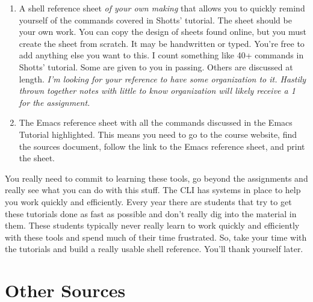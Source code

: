 \documentclass[]{tufte-handout}
\begin{document}
\begin{enumerate}
\item A shell reference sheet \textit{of your own making} that allows you to quickly remind yourself of the commands covered in Shotts' tutorial. The sheet should be your own work. You can copy the design of sheets found online, but you must create the sheet from scratch. It may be handwritten or typed. You're free to add anything else you want to this. I count something like 40+ commands in Shotts' tutorial. Some are given to you in passing. Others are discussed at length.  \textit{I'm looking for your reference to have some organization to it. Hastily thrown together notes with little to know organization will likely receive a 1 for the assignment.}  

\item The Emacs reference sheet with all the commands discussed in the Emacs Tutorial highlighted. This means you need to go to the course website, find the sources document, follow the link to the Emacs reference sheet, and print the sheet.   
\end{enumerate}

You really need to commit to learning these tools, go beyond the assignments and really see what you can do with this stuff. The CLI has systems in place to help you work quickly and efficiently. Every year there are students that try to get these tutorials done as fast as possible and don't really dig into the material in them. These students typically never really learn to work quickly and efficiently with these tools and spend much of their time frustrated. So, take your time with the tutorials and build a really usable shell reference. You'll thank yourself later. 


\section{Other Sources}
\end{document}
